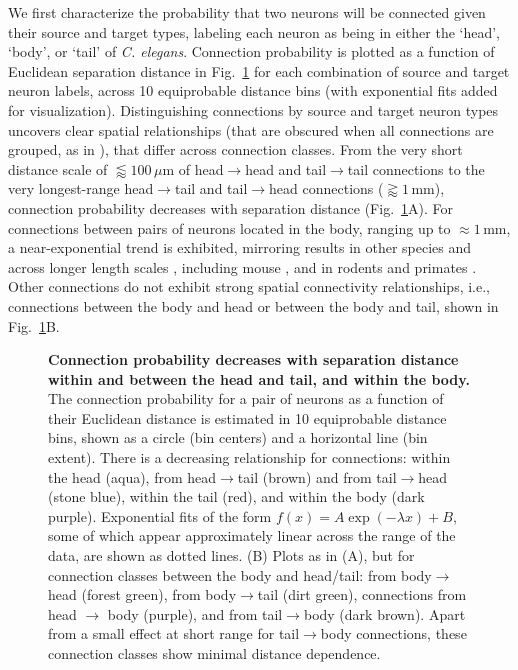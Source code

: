 We first characterize the probability that two neurons will be connected given their source and target types, labeling each neuron as being in either the `head', `body', or `tail' of \emph{C. elegans}.
Connection probability is plotted as a function of Euclidean separation distance in Fig.~\ref{fig:Ch2Fig3} for each combination of source and target neuron labels, across 10 equiprobable distance bins (with exponential fits added for visualization).
Distinguishing connections by source and target neuron types uncovers clear spatial relationships (that are obscured when all connections are grouped, as in \citep{Azulay2016}), that differ across connection classes.
From the very short distance scale of $\lessapprox 100\,\mu$m of head$\rightarrow$head and tail$\rightarrow$tail connections to the very longest-range head$\rightarrow$tail and tail$\rightarrow$head connections ($\gtrapprox 1\,$mm), connection probability decreases with separation distance (Fig.~\ref{fig:Ch2Fig3}A).
For connections between pairs of neurons located in the body, ranging up to $\approx 1$\,mm, a near-exponential trend is exhibited, mirroring results in other species and across longer length scales \citep{Wang2016}, including mouse \citep{Goulas2017, Fulcher2016}, and in rodents and primates \citep{Horvat2016}.
Other connections do not exhibit strong spatial connectivity relationships, i.e., connections between the body and head or between the body and tail, shown in Fig.~\ref{fig:Ch2Fig3}B.

\begin{figure}[h]
  \caption{
\textbf{Connection probability decreases with separation distance within and between the head and tail, and within the body.}
The connection probability for a pair of neurons as a function of their Euclidean distance is estimated in 10 equiprobable distance bins, shown as a circle (bin centers) and a horizontal line (bin extent).
There is a decreasing relationship for connections: within the head (aqua), from head$\rightarrow$tail (brown) and from tail$\rightarrow$head (stone blue), within the tail (red), and within the body (dark purple).
Exponential fits of the form $f(x) = A\exp(-\lambda x) + B$, some of which appear approximately linear across the range of the data, are shown as dotted lines.
(B)
Plots as in (A), but for connection classes between the body and head/tail: from body$\rightarrow$head (forest green), from body$\rightarrow$tail (dirt green), connections from head $\rightarrow$ body (purple), and from tail$\rightarrow$body (dark brown).
Apart from a small effect at short range for tail$\rightarrow$body connections, these connection classes show minimal distance dependence.}
\label{fig:Ch2Fig3}
\end{figure}

